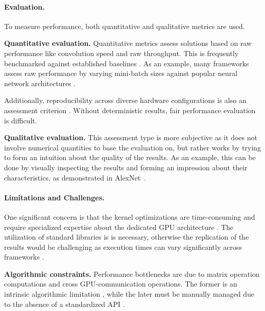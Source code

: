 \paragraph{Evaluation.}
To measure performance, both quantitative and qualitative metrics are used.

\textbf{Quantitative evaluation.}
Quantitative metrics assess solutions based on raw performance like convolution
speed and raw throughput. This is frequently benchmarked against established baselines
. As an example, many frameworks assess raw performance by varying mini-batch sizes
against popular neural network architectures .

Additionally, reproducibility across diverse hardware configurations is also an assessment
criterion . Without deterministic results, fair performance evaluation
is difficult.


\textbf{Qualitative evaluation.}
This assessment type is more subjective as it does not involve numerical quantities to base the
evaluation on, but rather works by trying to form an intuition about the quality of the results. As
an example, this can be done by visually inspecting the results and forming an impression about
their characteristics, as demonstrated in AlexNet~.

\paragraph{Limitations and Challenges.}
One significant concern is that the kernel optimizations are time-consuming and require specialized
expertise about the dedicated GPU architecture . The utilization of standard
libraries is is necessary, otherwise the replication of the results would be challenging as
execution times can vary significantly across frameworks .

\textbf{Algorithmic constraints.}
Performance bottlenecks are due to matrix operation computations and cross GPU-communication
operations. The former is an intrinsic algorithmic limitation , while the
later must be manually managed due to the absence of a standardized API .

